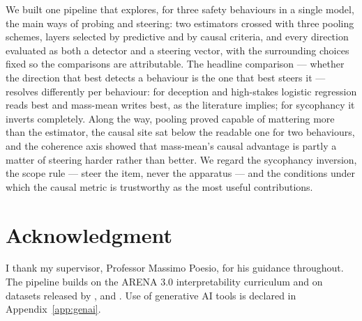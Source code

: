 \documentclass[conference]{IEEEtran}
\begin{document}
We built one pipeline that explores, for three safety behaviours in a single
model, the main ways of probing and steering: two estimators crossed with three
pooling schemes, layers selected by predictive and by causal criteria, and every
direction evaluated as both a detector and a steering vector, with the
surrounding choices fixed so the comparisons are attributable. The headline
comparison --- whether the direction that best detects a behaviour is the one
that best steers it --- resolves differently per behaviour: for deception and
high-stakes logistic regression reads best and mass-mean writes best, as the
literature implies; for sycophancy it inverts completely. Along the way, pooling
proved capable of mattering more than the estimator, the causal site sat below
the readable one for two behaviours, and the coherence axis showed that
mass-mean's causal advantage is partly a matter of steering harder rather than
better. We regard the sycophancy inversion, the scope rule --- steer the item,
never the apparatus --- and the conditions under which the causal metric is
trustworthy as the most useful contributions.

\section*{Acknowledgment}

I thank my supervisor, Professor Massimo Poesio, for his guidance
throughout. The pipeline builds on
the ARENA 3.0 interpretability curriculum \citep{arena2024} and on datasets
released by \citet{goldowsky2025}, \citet{mckenzie2025} and \citet{cincynlp2025}.
Use of generative AI tools is declared in Appendix~\ref{app:genai}.
\end{document}
